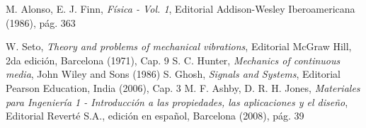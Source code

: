 \documentclass[twoside,twocolumn,a4paper]{article}
\begin{document}
\begin{thebibliography}{99} %


 M. Alonso, E. J. Finn, \textit{F\'isica - Vol. 1}, Editorial Addison-Wesley Iberoamericana (1986), p\'ag. 363

 W. Seto, \textit{Theory and problems of mechanical vibrations}, Editorial McGraw Hill, 2da edici\'on, Barcelona (1971), Cap. 9
 S. C. Hunter, \textit{Mechanics of continuous media}, John Wiley and Sons (1986)
 S. Ghosh, \textit{Signals and Systems}, Editorial Pearson Education, India (2006), Cap. 3
 M. F. Ashby, D. R. H. Jones, \textit{Materiales para Ingenier\'ia 1 - Introducci\'on a las propiedades, las aplicaciones y el dise\~no}, Editorial Revert\'e S.A., edici\'on en espa\~nol, Barcelona (2008), p\'ag. 39

 
\end{thebibliography}


\end{document}
